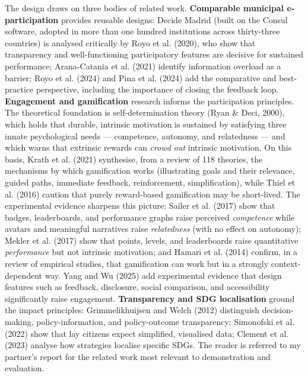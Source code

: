 \documentclass[11pt,a4paper]{article}
\begin{document}
The design draws on three bodies of related work. \textbf{Comparable municipal e-participation} provides reusable designs: Decide Madrid (built on the Consul software, adopted in more than one hundred institutions across thirty-three countries) is analysed critically by Royo et al. (2020), who show that transparency and well-functioning participatory features are decisive for sustained performance; Arana-Catania et al. (2021) identify information overload as a barrier; Royo et al. (2024) and Pina et al. (2024) add the comparative and best-practice perspective, including the importance of closing the feedback loop. \textbf{Engagement and gamification} research informs the participation principles. The theoretical foundation is self-determination theory (Ryan \& Deci, 2000), which holds that durable, intrinsic motivation is sustained by satisfying three innate psychological needs --- competence, autonomy, and relatedness --- and which warns that extrinsic rewards can \emph{crowd out} intrinsic motivation. On this basis, Krath et al. (2021) synthesise, from a review of 118 theories, the mechanisms by which gamification works (illustrating goals and their relevance, guided paths, immediate feedback, reinforcement, simplification), while Thiel et al. (2016) caution that purely reward-based gamification may be short-lived. The experimental evidence sharpens this picture: Sailer et al. (2017) show that badges, leaderboards, and performance graphs raise perceived \emph{competence} while avatars and meaningful narratives raise \emph{relatedness} (with no effect on autonomy); Mekler et al. (2017) show that points, levels, and leaderboards raise quantitative \emph{performance} but not intrinsic motivation; and Hamari et al. (2014) confirm, in a review of empirical studies, that gamification can work but in a strongly context-dependent way. Yang and Wu (2025) add experimental evidence that design features such as feedback, disclosure, social comparison, and accessibility significantly raise engagement. \textbf{Transparency and SDG localisation} ground the impact principles: Grimmelikhuijsen and Welch (2012) distinguish decision-making, policy-information, and policy-outcome transparency; Simonofski et al. (2022) show that lay citizens expect simplified, visualised data; Clement et al. (2023) analyse how strategies localise specific SDGs. The reader is referred to my partner's report for the related work most relevant to demonstration and evaluation.
\end{document}
